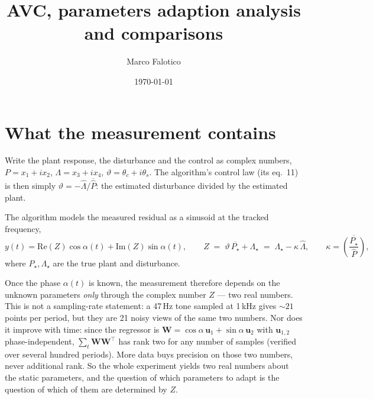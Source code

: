 \documentclass[11pt]{article}
\title{AVC, parameters adaption analysis and comparisons}
\author{Marco Falotico}
\date{\today}
\newcommand{\SI}[2]{#1\,#2}
\newcommand{\vW}{\mathbf{W}}
\begin{document}
\maketitle


\section{What the measurement contains}

Write the plant response, the disturbance and the control as complex
numbers, $P=x_1+ix_2$, $\Lambda=x_3+ix_4$,
$\vartheta=\theta_c+i\theta_s$. The algorithm's control law (its eq.~11)
is then simply $\vartheta=-\hat\Lambda/\overline{\hat P}$: the estimated
disturbance divided by the estimated plant.

The algorithm models the measured residual as a sinusoid at the tracked
frequency,
\begin{equation}
  y(t)=\mathrm{Re}(Z)\cos\alpha(t)+\mathrm{Im}(Z)\sin\alpha(t),
  \qquad
  Z \;=\; \vartheta\,\overline{P_\star}+\Lambda_\star
    \;=\; \Lambda_\star-\kappa\,\hat\Lambda,
  \qquad
  \kappa=\overline{\left(\frac{P_\star}{\hat P}\right)},
  \label{eq:Z}
\end{equation}
where $P_\star,\Lambda_\star$ are the true plant and disturbance.

Once the phase $\alpha(t)$ is known, the measurement therefore depends on
the unknown parameters \emph{only} through the complex number $Z$ --- two
real numbers. This is not a sampling-rate statement: a \SI{47}{Hz} tone
sampled at \SI{1}{kHz} gives $\sim\!21$ points per period, but they are 21
noisy views of the same two numbers. Nor does it improve with time: since
the regressor is
$\vW=\cos\alpha\,\mathbf{u}_1+\sin\alpha\,\mathbf{u}_2$ with
$\mathbf{u}_{1,2}$ phase-independent, $\sum_t\vW\vW^\top$ has rank two for
any number of samples (verified over several hundred periods). More data
buys precision on those two numbers, never additional rank. So the whole
experiment yields two real numbers about the static parameters, and the
question of which parameters to adapt is the question of which of them are
determined by $Z$.
\end{document}
